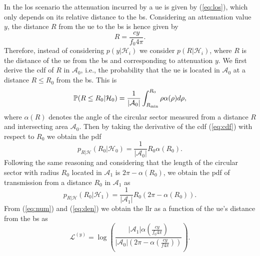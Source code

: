 \documentclass[conference,final]{IEEEtran}
\begin{document}
In the \ac{los} scenario the attenuation incurred by a \ac{ue} is given by (\ref{eq:los}), which only depends on its relative distance to the \ac{bs}. Considering an attenuation value $y$, the distance $R$ from the \ac{ue} to the \ac{bs} is hence given by 
\begin{equation}
    R = \frac{c y}{f_0 4 \pi}.
\end{equation}
Therefore, instead of considering $p(y|\mathcal H_i)$ we consider $p(R|\mathcal H_i)$, where $R$ is the distance of the \ac{ue} from the \ac{bs} and corresponding to attenuation $y$. We first derive the \ac{cdf} of $R$ in $\mathcal{A}_0$, i.e.,  the probability that the \ac{ue} is located in $\mathcal{A}_0$ at a distance $R\le R_0$ from the \ac{bs}. This is
\begin{equation}\label{eq:cdf}
     \mathbb{P}(R \le R_0|\mathcal{H}_0) = \frac{1}{|\mathcal{A}_0|}\int_{R_{\rm min}}^{R_0} \rho \alpha(\rho) d\rho,
\end{equation}
where $\alpha(R)$ denotes the angle of the circular sector measured from a distance $R$ and intersecting area $\mathcal{A}_0$. Then by taking the derivative of the \ac{cdf} (\ref{eq:cdf}) with respect to $R_0$ we obtain the \ac{pdf} 
\begin{equation}\label{eq:num}
    p_{R|\mathcal{H}}(R_0|\mathcal{H}_0) = \frac{1}{|\mathcal{A}_0|}R_0\alpha(R_0).
\end{equation}
Following the same reasoning and considering that the length of the circular sector with radius $R_0$ located in $\mathcal{A}_1$ is $2\pi - \alpha(R_0)$, we obtain the \ac{pdf} of transmission from a distance $R_0$ in $\mathcal{A}_1$ as
\begin{equation}\label{eq:den}
     p_{R|\mathcal{H}}(R_0|\mathcal{H}_1) = \frac{1}{|\mathcal{A}_1|}R_0\left(2\pi-\alpha(R_0)\right).
\end{equation}
From (\ref{eq:num}) and (\ref{eq:den}) we obtain the \ac{llr} as a function of the \ac{ue}'s distance from the \ac{bs} as 
\begin{equation}
    \mathcal{L}^{(y)}=\log\left(\frac{|\mathcal{A}_1|\alpha(\frac{c y}{f_0 4 \pi})}{|\mathcal{A}_0|\left(2\pi-\alpha(\frac{c y}{f 4 \pi})\right)}\right).
\end{equation}
\end{document}
